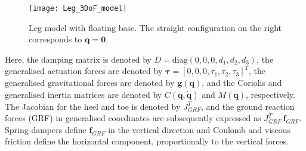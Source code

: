 \documentclass[letterpaper, 10 pt, conference]{ieeeconf}  %
\begin{document}
\begin{figure}[ht]
	\centering
	\texttt{[image: Leg\_3DoF\_model]}
	\caption{Leg model with floating base. The straight configuration on
		the right corresponds to $\mathbf{q} = \mathbf{0}$.}
	\label{fig:Leg_3DoF_model}
\end{figure}

Here, the damping matrix is denoted by $D = \mathrm{diag} (0,0,0,d_1,d_2,d_3)$, the generalised actuation forces are denoted by $\boldsymbol{\tau} = [0,0,0,\tau_1,\tau_2,\tau_3]^T$, the generalised gravitational forces are denoted by $\mathbf{g(q)}$, and the Coriolis and generalised inertia matrices are denoted by $C\mathbf{(q, \dot q)}$ and $M(\mathbf{q})$, respectively. The Jacobian for the heel and toe is denoted by $J_{GRF}^T$, and the ground reaction forces (GRF) in generalised coordinates are subsequently expressed as $J_{GRF}^T \, \mathbf{f}_{GRF}$. Spring-dampers define $\mathbf{f}_{GRF}$ in the vertical direction and Coulomb and viscous friction define the horizontal component, proportionally to the vertical forces.
\end{document}
